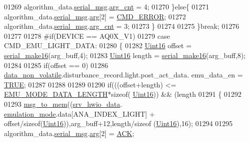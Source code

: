 \begin{DoxyCode}
{{{{{01269                          algorithm\_data.\hyperlink{a00016_afcf5f557aea688aad985eec15269c1da}{serial\_msg}.\hyperlink{a00031_a7b79f40e2eeec288091afd340bf8f591}{arg\_cnt} = 4;
01270                       \}\textcolor{keywordflow}{else}\{
01271                          algorithm\_data.\hyperlink{a00016_afcf5f557aea688aad985eec15269c1da}{serial\_msg}.\hyperlink{a00031_af7d6f762438c80072bd9dc0e4dd4ae1e}{arg}[2] = 
      \hyperlink{a00021_a1764a522e9c1a59a59be8757c69fa494}{CMD\_ERROR};
01272                          algorithm\_data.\hyperlink{a00016_afcf5f557aea688aad985eec15269c1da}{serial\_msg}.\hyperlink{a00031_a7b79f40e2eeec288091afd340bf8f591}{arg\_cnt} = 3;
01273                       \}
01274 
01275                 \}\textcolor{keywordflow}{break};
01276 
01277 
01278 \textcolor{preprocessor}{#if(DEVICE == AQ0X\_V1)}
01279                  \textcolor{keywordflow}{case}  CMD\_EMU\_LIGHT\_DATA:
01280                 \{
01282                     \hyperlink{a00072_a59a9f6be4562c327cbfb4f7e8e18f08b}{Uint16} offset = \hyperlink{a00031_abc17de32f14103a5be219df0d4ad9176}{serial\_make16}(arg\_buff,4);
01283                     \hyperlink{a00072_a59a9f6be4562c327cbfb4f7e8e18f08b}{Uint16} length = \hyperlink{a00031_abc17de32f14103a5be219df0d4ad9176}{serial\_make16}(arg\_buff,8);
01284 
01285                     \textcolor{keywordflow}{if}(offset == 0)
01286                         \hyperlink{a00060_a76ac5f917f5308dcd83de0d7c94559fb}{data\_non\_volatile}.disturbance\_record.light.post\_act\_data.
      emu\_data\_en = \hyperlink{a00040_aa8cecfc5c5c054d2875c03e77b7be15d}{TRUE};
01287 
01288 
01289             
01290                      \textcolor{keywordflow}{if}(((offset+length) <= \hyperlink{a00022_af4c3a8ad94feb4d7bda7f107f34baf41}{EMU\_MODE\_DATA\_LENGTH}*\textcolor{keyword}{sizeof}(
      \hyperlink{a00072_a59a9f6be4562c327cbfb4f7e8e18f08b}{Uint16})) && (length%
01291                       \{
01292 
01293                        \hyperlink{a00038_a126f3d78a95341a19a3e862e57357952}{msg\_to\_mem}((\hyperlink{a00034_a0fd91014631926f362c7c2b2f5d143b0}{srv\_hwio\_data}.
      \hyperlink{a00034_a742dceaef1f19ec73ed5acc066127476}{emulation\_mode}.data[ANA\_INDEX\_LIGHT] + offset/\textcolor{keyword}{sizeof}(\hyperlink{a00072_a59a9f6be4562c327cbfb4f7e8e18f08b}{Uint16})),arg\_buff+12,length/\textcolor{keyword}{sizeof}
      (\hyperlink{a00072_a59a9f6be4562c327cbfb4f7e8e18f08b}{Uint16}),16);
01294 
01295                          algorithm\_data.\hyperlink{a00016_afcf5f557aea688aad985eec15269c1da}{serial\_msg}.\hyperlink{a00031_af7d6f762438c80072bd9dc0e4dd4ae1e}{arg}[2] = \hyperlink{a00021_a6f6489887e08bff4887d0bc5dcf214d8}{ACK};
}}}}}
\end{DoxyCode}

